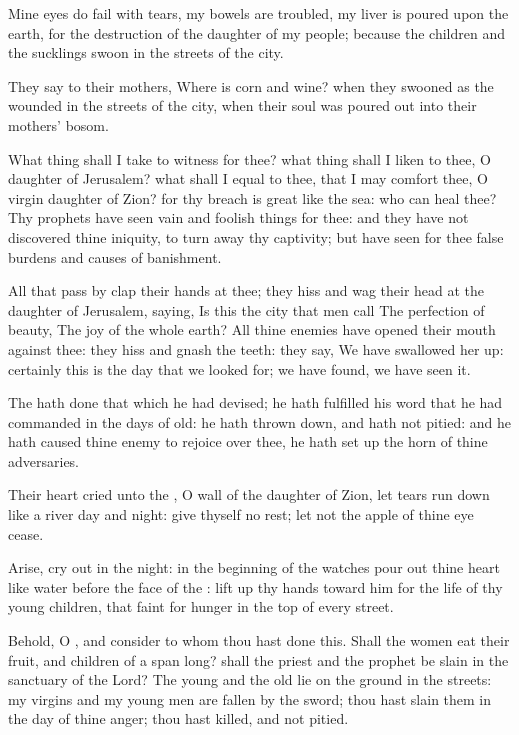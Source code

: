 \verse Mine eyes do fail with tears, my bowels are troubled, my liver is poured upon the earth, for the destruction of the daughter of my people; because the children and the sucklings swoon in the streets of the city.

\verse They say to their mothers, Where is corn and wine? when they swooned as the wounded in the streets of the city, when their soul was poured out into their mothers' bosom.

\verse What thing shall I take to witness for thee? what thing shall I liken to thee, O daughter of Jerusalem? what shall I equal to thee, that I may comfort thee, O virgin daughter of Zion? for thy breach is great like the sea: who can heal thee?  \verse Thy prophets have seen vain and foolish things for thee: and they have not discovered thine iniquity, to turn away thy captivity; but have seen for thee false burdens and causes of banishment.

\verse All that pass by clap their hands at thee; they hiss and wag their head at the daughter of Jerusalem, saying, Is this the city that men call The perfection of beauty, The joy of the whole earth?  \verse All thine enemies have opened their mouth against thee: they hiss and gnash the teeth: they say, We have swallowed her up: certainly this is the day that we looked for; we have found, we have seen it.

\verse The \LORD hath done that which he had devised; he hath fulfilled his word that he had commanded in the days of old: he hath thrown down, and hath not pitied: and he hath caused thine enemy to rejoice over thee, he hath set up the horn of thine adversaries.

\verse Their heart cried unto the \LORD, O wall of the daughter of Zion, let tears run down like a river day and night: give thyself no rest; let not the apple of thine eye cease.

\verse Arise, cry out in the night: in the beginning of the watches pour out thine heart like water before the face of the \LORD: lift up thy hands toward him for the life of thy young children, that faint for hunger in the top of every street.

\verse Behold, O \LORD, and consider to whom thou hast done this. Shall the women eat their fruit, and children of a span long? shall the priest and the prophet be slain in the sanctuary of the Lord?  \verse The young and the old lie on the ground in the streets: my virgins and my young men are fallen by the sword; thou hast slain them in the day of thine anger; thou hast killed, and not pitied.

